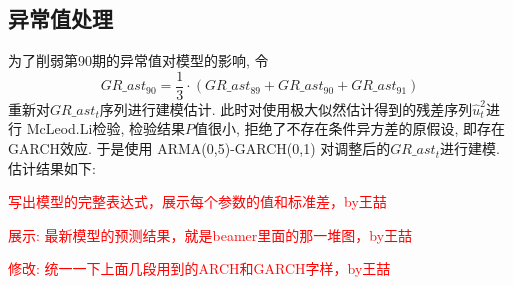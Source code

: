 \subsection{异常值处理}
为了削弱第90期的异常值对模型的影响, 令
$$GR\_ast_{90} = \frac{1}{3} \cdot (GR\_ast_{89}+GR\_ast_{90}+GR\_ast_{91})$$
重新对${GR\_ast_t}$序列进行建模估计.
此时对使用极大似然估计得到的残差序列${\hat{u}_t^2}$进行 McLeod.Li检验, 检验结果$P$值很小, 拒绝了不存在条件异方差的原假设, 即存在GARCH效应. 于是使用 ARMA(0,5)-GARCH(0,1) 对调整后的${GR\_ast_{t}}$进行建模. 估计结果如下:

\textcolor{red}{写出模型的完整表达式，展示每个参数的值和标准差，by王喆}

\textcolor{red}{展示: 最新模型的预测结果，就是beamer里面的那一堆图，by王喆}

\textcolor{red}{修改: 统一一下上面几段用到的ARCH和GARCH字样，by王喆}

